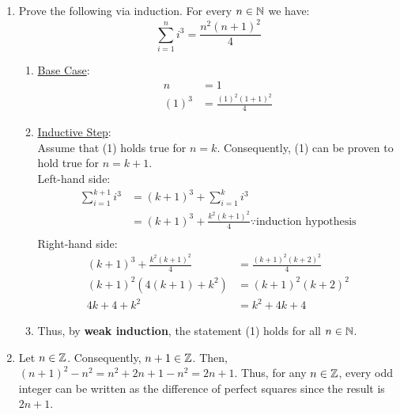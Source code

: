 \begin{enumerate}
    \item Prove the following via induction. For every $n \in \operatorname{\mathbb{N}}$ we have:
          \begin{equation}
              \sum_{i=1}^{n} i^3 = \frac{n^2(n+1)^2}{4}
          \end{equation}
          \begin{enumerate}[label=(\roman*), itemsep=10pt]
              \item \underline{Base Case}:
                    \begin{align*}
                        n     & = 1                        \\
                        (1)^3 & = \frac{(1)^2(1 + 1)^2}{4}
                    \end{align*}
              \item \underline{Inductive Step}: \\
                    Assume that (1) holds true for $n=k$. Consequently, (1) can be proven to hold true for $n = k + 1$. \\
                    Left-hand side:
                    \begin{align*}
                        \sum_{i=1}^{k+1} i^3 & = (k+1)^3 + \sum_{i=1}^{k} i^3                                            \\
                                             & = (k + 1)^3 + \frac{k^2(k+1)^2}{4} \because {\text{induction hypothesis}} \\
                    \end{align*}
                    Right-hand side:
                    \begin{align*}
                        (k + 1)^3 + \frac{k^2(k+1)^2}{4} & = \frac{(k+1)^2(k+2)^2}{4} \\
                        (k+1)^2\left(4(k+1) + k^2\right) & = (k+1)^2(k+2)^2           \\
                        4k + 4 + k^2                     & = k^2 + 4k + 4
                    \end{align*}

              \item Thus, by \textbf{weak induction}, the statement (1) holds for all $n \in \operatorname{\mathbb{N}}$.
          \end{enumerate}
    \item Let $n \in \operatorname{\mathbb{Z}}$. Consequently, $n+1 \in \operatorname{\mathbb{Z}}$. Then, $(n+1)^2 - n^2 = n^2+2n+1-n^2 =2n+1$. Thus, for any $n \in \operatorname{\mathbb{Z}}$, every odd integer can be written as the difference of perfect squares since the result is $2n + 1$.
\end{enumerate}